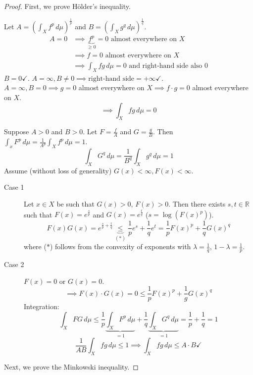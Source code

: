 \documentclass{article}
\begin{document}
\begin{proof}
  First, we prove H\"older's inequality.

  Let $A = \left(\int_X f^p \, d\mu\right)^{\frac1p}$ and $B = \left(\int_X g^q \, d\mu\right)^{\frac1q}$.
  \begin{align*}
    A = 0 &\implies \underbrace{f^p}_{\geq 0} = 0 \text{ almost everywhere on } X \\
          &\implies f = 0 \text{ almost everywhere on } X \\
          &\implies \int_X f g \, d\mu = 0 \text{ and right-hand side also } 0
  \end{align*}
  $B = 0 \checkmark$. $A = \infty, B \neq 0 \implies \text{right-hand side} = +\infty \checkmark$. \\
  $A = \infty, B = 0 \implies g = 0$ almost everywhere on $X \implies f \cdot g = 0$ almost everywhere on $X$.
  \[ \implies \int_X fg \, d\mu = 0 \]

  Suppose $A > 0$ and $B > 0$. Let $F = \frac{f}{A}$ and $G = \frac{g}{B}$. Then $\int_x F^p \, d\mu = \frac{1}{A^p} \int_X f^p \, d\mu = 1$.
  \[ \int_X G^q \, d\mu = \frac{1}{B^q} \int_X g^q \, d\mu = 1 \]
  Assume (without loss of generality) $G(x) < \infty, F(x) < \infty$.

  \begin{description}
    \item[Case 1] 
      Let $x \in X$ be such that $G(x) > 0$, $F(x) > 0$. Then there exists $s,t \in \mathbb R$ such that $F(x) = e^{\frac{s}{p}}$ and $G(x) = e^{\frac{t}{q}}$ ($s = \log(F(x)^p)$).
      \[ F(x) G(x) = e^{\frac sp + \frac tq} \underbrace{\leq}_{(*)} \frac1p e^s + \frac1q e^t = \frac1p F(x)^p + \frac1q G(x)^q \]
      where ($*$) follows from the convexity of exponents with $\lambda = \frac{1}{q}$, $1 - \lambda = \frac{1}{p}$.
    \item[Case 2]
      $F(x) = 0$ or $G(x) = 0$.
      \[ \implies F(x) \cdot G(x) = 0 \leq \frac1p F(x)^p + \frac1g G(x)^q \]
      Integration:
      \[ \int_X FG \, d\mu \leq \frac1p \underbrace{\int_X F^p \, d\mu}_{=1} + \frac1q \underbrace{\int_X G^q \, d\mu}_{=1} = \frac1p + \frac1q = 1 \]
      \[ \frac{1}{AB} \int_X fg \, d\mu \leq 1 \implies \int_X fg \, d\mu \leq A \cdot B \checkmark \]
  \end{description}

  Next, we prove the Minkowski inequality.


\end{proof}
\end{document}

